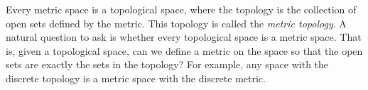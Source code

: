 \begin{comment}

\ActivitySolution

\ba
\item 
	\begin{enumerate}[i.]
	\item Since there is no set in $\mathcal{B}$ that contains the element $b$, the set $\mathcal{B}$ is not a basis for the topology $\tau$. Since every set in $\mathcal{B}$ must be an open set, and every set in $\tau$ has to be a union of sets in $\mathcal{B}$, we need add the open sets $\{c,d\}$ and $\{b,c,d,e,f\}$ to $\mathcal{B}$ to make a basis for the topology.
	
	\item Since
\begin{align*}
\{a\} &= \{a\} \\
\{c,d\} &= \{c,d\} \\
\{a,c,d\} &= \{a\} \cup \{c,d\} \\
\{b,c,d,e,f\} &= \{b,c,d,e,f\}
X &=  \{a\} \cup\{b,c,d,e,f\},
\end{align*}
we conclude that $\mathcal{B}$ is a basis for $\tau$

	\end{enumerate}
	
\item The set $\mathcal{B}$ is not a basis for $\tau$ because $\{b\}$ is not a union of sets in $\mathcal{B}$. If we add $\{b\}$ to $\mathcal{B}$, then we have all of the single point sets. Every subset of $X$ can be made of a union of single point sets, which then produces a basis for $\tau$. 

\item Since every single point set is open, our basis has to include all single point sets. But every subset of $X$ can be made of a union of single point sets, which explains why the collection of single points sets is a basis for $\tau$. 

\ea

\end{comment}

\label{sec_metric_top_space}

Every metric space is a topological space, where the topology is the collection of open sets defined by the metric. This topology is called the \emph{metric topology}. A natural question to ask is whether every topological space is a metric space. That is, given a topological space, can we define a metric on the space so that the open sets are exactly the sets in the topology? For example, any space with the discrete topology is a metric space with the discrete metric. 

